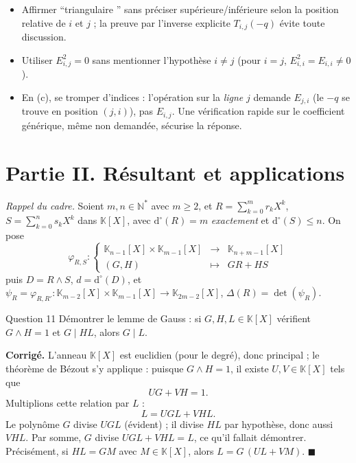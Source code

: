 \documentclass[11pt,a4paper]{article}
\newenvironment{corrige}
  {\par\medskip\noindent
   \begin{tcolorbox}[blanker, breakable,
     borderline west={2.5pt}{0pt}{vertP},
     left=10pt, top=2pt, bottom=2pt]
   {\color{vertP}\bfseries Corrigé.}\hspace{0.5em}\ignorespaces}
  {\hfill$\blacksquare$\end{tcolorbox}\medskip}
\newcommand{\og}{``}
\newcommand{\fg}{''}
\newcommand{\K}{\mathbb{K}}
\newcommand{\N}{\mathbb{N}}
\newcommand{\dg}[1]{\mathrm{d}^{\circ}\!\left(#1\right)}
\begin{document}
\begin{pieges}
\begin{itemize}[leftmargin=1.4em, itemsep=2pt]
\item Affirmer \og triangulaire \fg{} sans préciser
supérieure/inférieure selon la position relative de $i$ et $j$ ; la
preuve par l'inverse explicite $T_{i,j}(-q)$ évite toute discussion.
\item Utiliser $E_{i,j}^{2}=0$ sans mentionner l'hypothèse $i\neq j$
(pour $i=j$, $E_{i,i}^2=E_{i,i}\neq 0$).
\item En (c), se tromper d'indices : l'opération sur la \emph{ligne}
$j$ demande $E_{j,i}$ (le $-q$ se trouve en position $(j,i)$), pas
$E_{i,j}$. Une vérification rapide sur le coefficient générique,
même non demandée, sécurise la réponse.
\end{itemize}
\end{pieges}

\section{Partie II. Résultant et applications}

\noindent\emph{Rappel du cadre.} Soient $m,n\in\N^{*}$ avec
$m\ge 2$, et $R=\sum_{k=0}^{m}r_kX^{k}$, $S=\sum_{k=0}^{n}s_kX^{k}$
dans $\K[X]$, avec $\dg{R}=m$ \emph{exactement} et $\dg{S}\le n$. On
pose
\[
\varphi_{R,S}:\left\{
\begin{array}{ccl}
\K_{n-1}[X]\times\K_{m-1}[X] & \longrightarrow & \K_{n+m-1}[X]\\
(G,H) & \longmapsto & GR+HS
\end{array}\right.
\]
puis $D=R\wedge S$, $d=\dg{D}$, et
$\psi_R=\varphi_{R,R'}:\K_{m-2}[X]\times\K_{m-1}[X]\to\K_{2m-2}[X]$,
$\Delta(R)=\det(\psi_R)$.

\begin{enonce}{Question 11}
Démontrer le lemme de Gauss : si $G,H,L\in\K[X]$ vérifient
$G\wedge H=1$ et $G\mid HL$, alors $G\mid L$.
\end{enonce}

\begin{corrige}
L'anneau $\K[X]$ est euclidien (pour le degré), donc principal ; le
théorème de Bézout s'y applique : puisque $G\wedge H=1$, il existe
$U,V\in\K[X]$ tels que
\[
UG+VH=1 .
\]
Multiplions cette relation par $L$ :
\[
L=UGL+VHL .
\]
Le polynôme $G$ divise $UGL$ (évident) ; il divise $HL$ par
hypothèse, donc aussi $VHL$. Par somme, $G$ divise
$UGL+VHL=L$, ce qu'il fallait démontrer. Précisément, si $HL=GM$
avec $M\in\K[X]$, alors $L=G\,(UL+VM)$.
\end{corrige}
\end{document}
